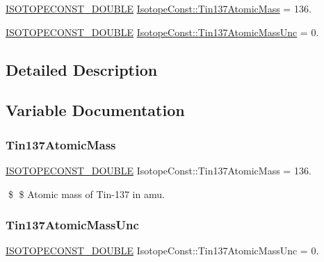 \begin{DoxyCompactItemize}
\item 
\mbox{\hyperlink{group___isotope_const-_macros_ga8f45a7272ce02c0b4c65c44636ed719a}{I\+S\+O\+T\+O\+P\+E\+C\+O\+N\+S\+T\+\_\+\+D\+O\+U\+B\+LE}} \mbox{\hyperlink{group___isotope_const-_tin-_sn137_ga9cef096890a2f5350b6aafb894a9b7ec}{Isotope\+Const\+::\+Tin137\+Atomic\+Mass}} = 136.
\item 
\mbox{\hyperlink{group___isotope_const-_macros_ga8f45a7272ce02c0b4c65c44636ed719a}{I\+S\+O\+T\+O\+P\+E\+C\+O\+N\+S\+T\+\_\+\+D\+O\+U\+B\+LE}} \mbox{\hyperlink{group___isotope_const-_tin-_sn137_ga671d860065922938cc0cb2c0e093b4d4}{Isotope\+Const\+::\+Tin137\+Atomic\+Mass\+Unc}} = 0.
\end{DoxyCompactItemize}


\subsection{Detailed Description}


\subsection{Variable Documentation}
\mbox{\label{group___isotope_const-_tin-_sn137_ga9cef096890a2f5350b6aafb894a9b7ec}} 
\subsubsection{\texorpdfstring{Tin137\+Atomic\+Mass}{Tin137AtomicMass}}
{\footnotesize\ttfamily \mbox{\hyperlink{group___isotope_const-_macros_ga8f45a7272ce02c0b4c65c44636ed719a}{I\+S\+O\+T\+O\+P\+E\+C\+O\+N\+S\+T\+\_\+\+D\+O\+U\+B\+LE}} Isotope\+Const\+::\+Tin137\+Atomic\+Mass = 136.}

\$ \$ Atomic mass of Tin-\/137 in amu. \mbox{\label{group___isotope_const-_tin-_sn137_ga671d860065922938cc0cb2c0e093b4d4}} 
\subsubsection{\texorpdfstring{Tin137\+Atomic\+Mass\+Unc}{Tin137AtomicMassUnc}}
{\footnotesize\ttfamily \mbox{\hyperlink{group___isotope_const-_macros_ga8f45a7272ce02c0b4c65c44636ed719a}{I\+S\+O\+T\+O\+P\+E\+C\+O\+N\+S\+T\+\_\+\+D\+O\+U\+B\+LE}} Isotope\+Const\+::\+Tin137\+Atomic\+Mass\+Unc = 0.}

